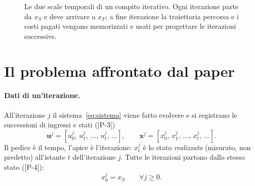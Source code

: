 \documentclass[11pt,a4paper]{article}
\theoremstyle{definition}
\theoremstyle{plain}
\theoremstyle{remark}
\newcommand{\eqp}[1]{\textup{[P-#1]}}   %
\newcommand{\vett}[1]{\mathbf{#1}}
\begin{document}
\begin{figure}[h]
\centering
{}
\caption{Le due scale temporali di un compito iterativo. Ogni iterazione parte
da $x_S$ e deve arrivare a $x_F$; a fine iterazione la traiettoria percorsa e
i costi pagati vengono memorizzati e usati per progettare le iterazioni
successive.}
\label{fig:scale}
\end{figure}

\section{Il problema affrontato dal paper}\label{sec:problema}

\paragraph{Dati di un'iterazione.}
All'iterazione $j$ il sistema~\eqref{eq:sistema} viene fatto evolvere e si
registrano le successioni di ingressi e stati (\eqp{3})
\[
  \vett{u}^j = [u^j_0,\,u^j_1,\,\dots,\,u^j_t,\,\dots],\qquad
  \vett{x}^j = [x^j_0,\,x^j_1,\,\dots,\,x^j_t,\,\dots].
\]
Il pedice è il tempo, l'apice è l'iterazione: $x^j_t$ è lo stato
\emph{realizzato} (misurato, non predetto) all'istante $t$ dell'iterazione
$j$. Tutte le iterazioni partono dallo stesso stato (\eqp{4}):
\begin{equation}\label{eq:stato-iniziale}
  x^j_0 = x_S\qquad\forall j\ge 0.
\end{equation}
\end{document}
